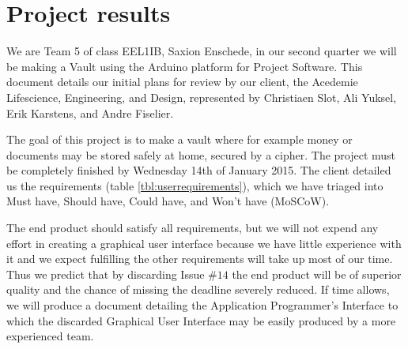 \chapter{Project results}
We are Team 5 of class EEL1IB, Saxion Enschede, in our second quarter we will be making a Vault using the Arduino platform for Project Software. This document details our initial plans for review by our client, the Acedemie Lifescience, Engineering, and Design, represented by Christiaen Slot, Ali Yuksel, Erik Karstens, and Andre Fiselier.

The goal of this project is to make a vault where for example money or documents may be stored safely at home, secured by a cipher. The project must be completely finished by Wednesday 14th of January 2015. The client detailed us the requirements (table \ref{tbl:userrequirements}), which we have triaged into Must have, Should have, Could have, and Won't have (MoSCoW).

The end product should satisfy all requirements, but we will not expend any effort in creating a graphical user interface because we have little experience with it and we expect fulfilling the other requirements will take up most of our time. Thus we predict that by discarding Issue $\#14$ the end product will be of superior quality and the chance of missing the deadline severely reduced. If time allows, we will produce a document detailing the Application Programmer's Interface to which the discarded Graphical User Interface may be easily produced by a more experienced team.

